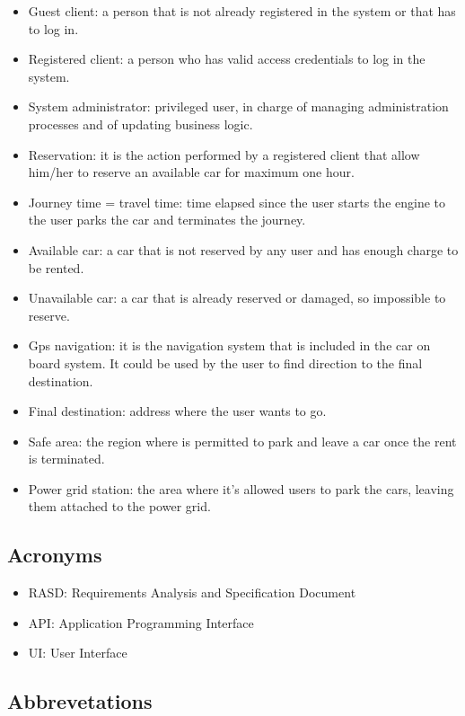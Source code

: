 \begin{itemize}
\item Guest client: a person that is not already registered in the system or that has to log in.
\item Registered client: a person who has valid access credentials to log in the system.
\item System administrator: privileged user, in charge of managing administration processes and of updating business logic.
\item Reservation: it is the action performed by a registered client that allow him/her to reserve an available car for maximum one hour.
\item Journey time = travel time: time elapsed since the user starts the engine to the user parks the car and terminates the journey.
\item Available car: a car that is not reserved by any user and has enough charge to be rented.
\item Unavailable car: a car that is already reserved or damaged, so impossible to reserve.
\item Gps navigation: it is the navigation system that is included in the car on board system. It could be used by the user to find direction to the final destination.
\item Final destination: address where the user wants to go.
\item Safe area: the region where is permitted to park and leave a car once the rent is terminated.
\item Power grid station: the area where it’s allowed users to park the cars, leaving them attached to the power grid.
\end{itemize}

\subsection{Acronyms}

\begin{itemize}
\item RASD: Requirements Analysis and Specification Document
\item API: Application Programming Interface
\item UI: User Interface
\end{itemize}

\subsection{Abbrevetations}

